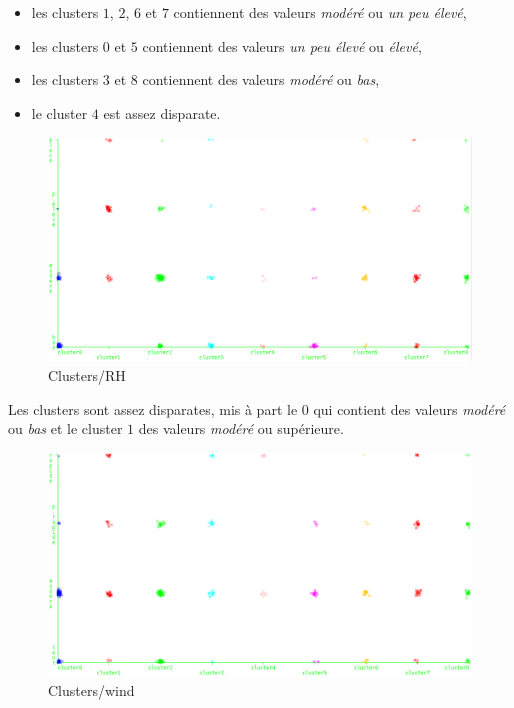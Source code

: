 \documentclass{article}
\begin{document}
\begin{sffamily}
\begin{itemize}
\item les clusters $1$, $2$, $6$ et $7$ contiennent des valeurs \textit{modéré} ou \textit{un peu élevé},
\item les clusters $0$ et $5$ contiennent des valeurs \textit{un peu élevé} ou \textit{élevé},
\item les clusters $3$ et $8$ contiennent des valeurs \textit{modéré} ou \textit{bas},
\item le cluster $4$ est assez disparate.
\end{itemize}

\newpage

\begin{figure}[h!]
    \begin{center}
    \includegraphics[width=\textwidth]{img_014.pdf}
    \caption{Clusters/RH}
    \end{center}	
\end{figure}

Les clusters sont assez disparates, mis à part le $0$ qui contient des valeurs \textit{modéré} ou \textit{bas} et le cluster $1$ des valeurs 
\textit{modéré} ou supérieure.

\begin{figure}[h!]
    \begin{center}
    \includegraphics[width=\textwidth]{img_015.pdf}
    \caption{Clusters/wind}
    \end{center}	
\end{figure}


\end{sffamily}
\end{document}

